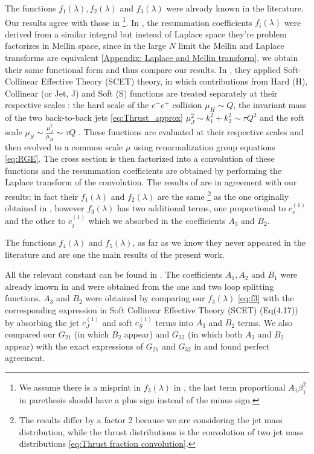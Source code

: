 \documentclass[../Tesi_Jiahao_Miao_986136.tex]{subfiles}
\begin{document}
The functions $f_1(\lambda),f_2(\lambda)$ and $f_3(\lambda)$ were already known in the literature. Our results agree with those in \cite{CATANI19933,Aglietti:2005mb,Monni:2011gb} 
\footnote{We assume there is a misprint in $f_3(\lambda)$ in \cite{Monni:2011gb}, the last term proportional $A_1 \beta_1^2$ in parethesis should have a plus sign instead of
the minus sign.}.
In \cite{Aglietti:2005mb}, the resummation coefficients $f_i(\lambda)$ were derived from a similar integral but instead of Laplace space they're problem factorizes in
Mellin space, since in the large $N$ limit the Mellin and Laplace transforms are equivalent \cref{Appendix: Laplace and Mellin transform}, we obtain their same functional
form and thus compare our results.
In \cite{Monni:2011gb}, they applied Soft-Collinear Effective Theory (SCET) theory, in which contributions from Hard (H), Collinear (or Jet, J) and Soft (S) functions are treated separately
at their respective scales \cite{Becher_2008}: the hard scale of the $e^-e^+$  collision $ \mu_H \sim Q$, the invariant mass of the two back-to-back jets \cref{eq:Thrust_approx} $\mu_J^2 \sim k_1^2+k_2^2 \sim \tau Q^2$  and 
the soft scale $\mu_S \sim \frac{\mu_J^2}{\mu_H}\sim \tau Q$ . These functions are evaluated at their respective scales and then evolved to a common scale $\mu$ using renormalization group equations \cref{eq:RGE}.
The cross section is then factorized into a convolution of these functions and the resummation coefficients are obtained by performing the Laplace transform of the convolution.
The results of \cite{Monni:2011gb} are in agreement with our results; in fact their $f_1(\lambda)$ and $f_2(\lambda)$ are the same \footnote{The results differ by a factor 2 because we are considering the jet mass distribution, while the thrust distributions
is the convolution of two jet mass distributions \cref{eq:Thrust fraction convolution}.}
as the one originally obtained in \cite{CATANI19933}, however $f_3(\lambda)$ has two additional terms, one proportional to $c_s^{(1)}$ and the other to $c_j^{(1)}$ which we absorbed in the coefficients $A_3$ and $B_2$.

The functions $f_4(\lambda)$ and $f_5(\lambda)$, as far as we know they never appeared in the literature and are one the main results of the present work.

All the relevant constant can be found in .
The coefficients $A_1,A_2$ and $B_1$ were already known in \cite{CATANI19933} and were obtained from the one and two loop splitting functions.
$A_3$ and $B_2$ were obtained by comparing our $f_3(\lambda)$ \cref{eq:f3} with the corresponding expression in Soft Collinear Effective Theory (SCET) \cite{Monni:2011gb} (Eq(4.17)) by 
absorbing the jet $c_J^{(1)}$ and soft $c_S^{(1)}$ terms into $A_3$ and $B_2$ terms.
We also compared our $G_{21}$ (in which $B_2$ appear) and $G_{32}$ (in which both $A_3$ and $B_2$ appear) with the exact expressions of 
$G_{21}$ and $G_{32}$ in \cite{Becher_2008} and found perfect agreement.
\end{document}
